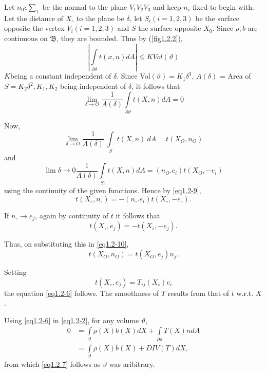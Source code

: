 Let $n_0 \epsilon \sum_1$ be the normal to the plane $V_1 V_2 V_3$
and keep $n_\circ$ fixed to begin with. Let the distance of $X_\circ$
to the plane be $\delta$, let $S_i(i = 1,2,3)$ be the surface opposite
the vertex $V_i(i = 1,2,3)$ and $S$ the surface opposite $X_0$. Since
$\rho,b$ are continuous on $\mathfrak{B}$, they are bounded. Thus by
(\ref{fig1.2.2}), 
$$
| \int\limits_{\partial \vartheta}t(x,n) dA | \leq K Vol (\vartheta)
$$
$K$\pageoriginale  being a constant independent of $\delta$. Since Vol$(\vartheta) =
K_1 \delta^3$, $A(\delta)$ = Area of $S = K_2 \delta^2, K_1,K_2$ being
independent of $\delta$, it follows that  
\begin{equation*} 
\lim_{\delta \to O} \frac{1}{A(\delta )}
\int\limits_{\partial\vartheta}t(X,n)dA = 0\tag{1.2-9} \label{eq1.2-9}
\end{equation*}

Now,
$$
\lim_{\delta \rightarrow O} \frac{1}{A(\delta)}~\int\limits_S~
  t(X,n)~dA = t(X_O,n_O)
$$
and
$$
  \lim{\delta \rightarrow 0} \frac{1}{A(\delta)}\int\limits_{S_i} t(X,n)
  dA = (n_O.e_i) t(X_O,-e_i)
$$
using the continuity of the given functions. Hence by \eqref{eq1.2-9},
\begin{equation*}
t(X_\circ ,n_\circ) = - (n_\circ . e_i) t(X_\circ ,-e_\circ
).\tag{1.2-10}\label{eq1.2-10} 
\end{equation*}

If $n_\circ \to e_j$, again by continuity of $t$ it follows that 
$$
t(X_\circ ,e_j) = - t(X_\circ,-e_j).
$$

Thus, on substituting this in \eqref{eq1.2-10},
\begin{equation*}
t(X_O,n_O) = t(X_O, e_j) n_j.\tag{1.2-11}\label{eq1.2-11}
\end{equation*}

Setting
$$
t(X_\circ ,e_j) = T_{ij} (X_\circ) e_i
$$
the equation \eqref{eq1.2-6} follows. The smoothness of $T$ results from
that of $t$ w.r.t. $X$. 

Using \eqref{eq1.2-6} in \eqref{eq1.2-2}, for any volume $\vartheta$,
\begin{align*}
0 & = \int\limits_{\vartheta} \rho (X) b(X) dX +
\int\limits_{\partial\vartheta} T(X) n dA\\ 
& = \int\limits_{\vartheta} \rho (X) b(X) + DIV (T) dX,
\end{align*}\pageoriginale 
from which \eqref{eq1.2-7} follows as $\vartheta$ was aribitrary.

